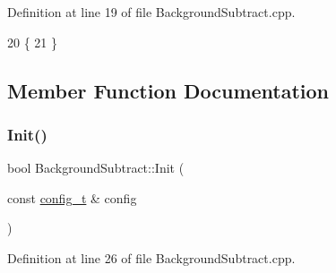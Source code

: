 Definition at line 19 of file Background\+Subtract.\+cpp.


\begin{DoxyCode}
20 \{
21 \}
\end{DoxyCode}


\subsection{Member Function Documentation}
\mbox{\label{class_background_subtract_a9dacb4cc5cf41c4a37cc776a8142aecc}} 
\subsubsection{\texorpdfstring{Init()}{Init()}}
{\footnotesize\ttfamily bool Background\+Subtract\+::\+Init (\begin{DoxyParamCaption}\item[{const \mbox{\hyperlink{defines_8h_a81d657237a541d02f8eeefdd40191920}{config\+\_\+t}} \&}]{config }\end{DoxyParamCaption})}



Definition at line 26 of file Background\+Subtract.\+cpp.



